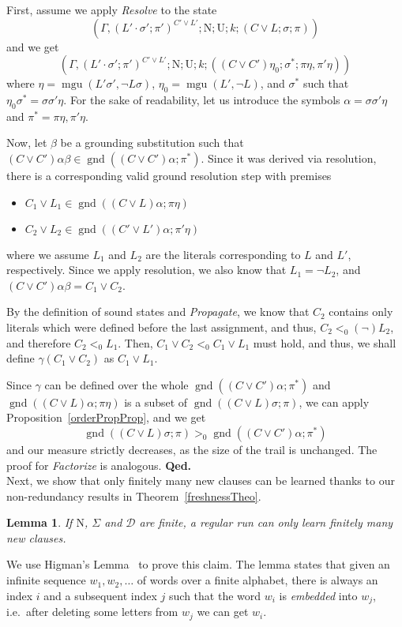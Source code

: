 \documentclass[a4paper]{article}
\newcommand{\mGnd}{\operatorname{gnd}} \newcommand{\mLVar}{\operatorname{lvar}} \newcommand{\mRVar}{\operatorname{rvar}} \newcommand{\mDmn}{\operatorname{dom}} \newcommand{\mRng}{\operatorname{rng}} \newcommand{\mMGU}{\operatorname{mgu}} \newcommand{\mDef}{\operatorname{def}} \newcommand{\mDomain}{\mathcal{D}} \newcommand{\mVar}{\operatorname{var}}
\newcommand{\startproof}{{\bf Proof:~}}
\newcommand{\finishproof}{{\bf Qed.}}
\newcommand{\leaveabit}{\\[6 pt]}
\newtheorem{lemm}[defi]{Lemma}
\begin{document}
First, assume we apply \emph{Resolve} to the state 
	\[(\Gamma, (L'\cdot\sigma'; \pi')^{C' \lor L'}; \text{N}; \text{U}; k; (C \lor L; \sigma; \pi))\]
and we get
  \[(\Gamma, (L'\cdot\sigma'; \pi')^{C' \lor L'}; \text{N}; \text{U}; k; ((C \lor C')\eta_0; \sigma^*; \pi\eta, \pi'\eta))\]
where $\eta = \mMGU(L'\sigma', \neg L\sigma)$, 
$\eta_0 = \mMGU(L', \neg L)$, and 
$\sigma^*$ such that $\eta_0\sigma^* = \sigma\sigma'\eta$. 
For the sake of readability, let us introduce the symbols $\alpha = \sigma\sigma'\eta$ and $\pi^* = \pi\eta, \pi'\eta$.

Now, let $\beta$ be a grounding substitution such that $(C\lor C')\alpha\beta \in \mGnd( (C \lor C')\alpha; \pi^*)$. Since it was derived via resolution, 
there is a corresponding valid ground resolution step with premises 
	\begin{itemize}
		\item $C_1  \lor L_1 \in \mGnd((C \lor L)\alpha; \pi\eta)$
		\item $C_2 \lor L_2 \in \mGnd((C' \lor L')\alpha; \pi'\eta)$
	\end{itemize}
where we assume $L_1$ and $L_2$ are the literals corresponding to $L$ and $L'$, respectively. 
Since we apply resolution, we also know that $L_1 = \neg L_2$, and $(C\lor C')\alpha\beta = C_1 \lor C_2$.

By the definition of sound states and \emph{Propagate}, 
we know that $C_2$ contains only literals which were defined before the last assignment, 
and thus, $C_2 <_0 (\neg) L_2$, and therefore $C_2 <_0 L_1$. 
Then, $C_1 \lor C_2 <_0 C_1 \lor L_1$ must hold, 
and thus, we shall define $\gamma(C_1 \lor C_2)$ as $C_1 \lor L_1$.

Since $\gamma$ can be defined over the whole $\mGnd((C \lor C')\alpha; \pi^*)$ and $\mGnd((C \lor L)\alpha; \pi\eta)$ is a subset of 
$\mGnd((C \lor L)\sigma; \pi)$, we can apply Proposition~\ref{orderPropProp}, and we get 
\[\mGnd((C \lor L)\sigma; \pi) >_{0} \mGnd((C \lor C')\alpha; \pi^*)\]
and our measure strictly decreases, as the size of the trail is unchanged.
The proof for \emph{Factorize} is analogous.
\finishproof\leaveabit
\noindent
Next, we show that only finitely many new clauses can be learned thanks to our non-redundancy results in Theorem~\ref{freshnessTheo}.
\begin{lemm}\label{finiteLearningTheo}
If $\text{N}$, $\Sigma$ and $\mDomain$ are finite, a regular run can only learn finitely many new clauses.
\end{lemm}
\noindent\startproof
We use Higman's Lemma~\cite{Higman52} to prove this claim.
The lemma states that given an infinite sequence $w_1, w_2, \dots$ of words over a finite alphabet, there is always an index $i$ and a subsequent index $j$ such 
that the word $w_i$ is \emph{embedded} into $w_j$, i.e.\ after deleting some letters from $w_j$ we can get $w_i$.
\end{document}
